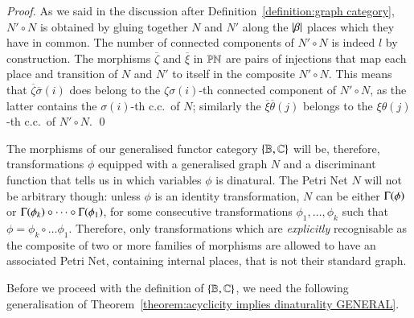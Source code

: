 \begin{proof}
    As we said in the discussion after Definition~\ref{definition:graph category}, $N' \circ N$ is obtained by gluing together $N$ and $N'$ along the $\lvert \beta \rvert$ places which they have in common. The number of connected components of $N' \circ N$ is indeed $l$ by construction. The morphisms $\overline\zeta$ and $\overline\xi$ in $\mathbb{PN}$ are pairs of injections that map each place and transition of $N$ and $N'$ to itself in the composite $N' \circ N$. This means that $\overline\zeta \overline\sigma(i)$ does belong to the $\zeta\sigma(i)$-th connected component of $N' \circ N$, as the latter contains the $\sigma(i)$-th c.c.\ of $N$; similarly the $\overline\xi \overline\theta (j)$ belongs to the $\xi\theta(j)$-th c.c.\ of $N' \circ N$.  \qed
\end{proof}

The morphisms of our generalised functor category $\{ \mathbb B,\mathbb C\}$ will be, therefore, transformations $\phi$ equipped with a generalised graph $N$ and a discriminant function that tells us in which variables $\phi$ is dinatural. The Petri Net $N$ will not be arbitrary though: unless $\phi$ is an identity transformation, $N$ can be either $\graph\phi$ or $\graph{\phi_k} \circ \dots \circ \graph{\phi_1}$, for some consecutive transformations $\phi_1,\dots,\phi_k$ such that $\phi = \phi_k \circ \dots \phi_1$. Therefore, only transformations which are \emph{explicitly} recognisable as the composite of two or more families of morphisms are allowed to have an associated Petri Net, containing internal places, that is not their standard graph. 

Before we proceed with the definition of $\{ \mathbb B,\mathbb C\}$, we need the following generalisation of Theorem~\ref{theorem:acyclicity implies dinaturality GENERAL}.

